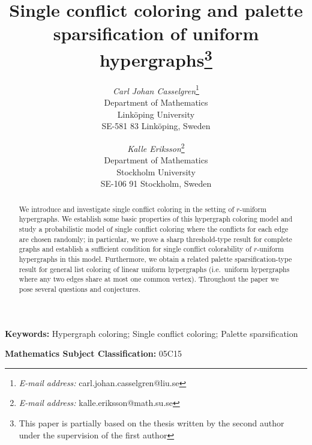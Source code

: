 \documentclass[12pt]{article}
\newcommand{\1}{\mathds{1}}
\begin{document}
\title{Single conflict coloring and palette sparsification of uniform 
hypergraphs\footnote{This paper is partially based on the thesis written 
by the second author under the supervision of the first author}}


\author{
{\sl Carl Johan Casselgren}\thanks{{\it E-mail address:} 
carl.johan.casselgren@liu.se}\\ 
Department of Mathematics \\
Link\"oping University \\ 
SE-581 83 Link\"oping, Sweden
\and
{\sl Kalle Eriksson}\thanks{{\it E-mail address:} 
kalle.eriksson@math.su.se}\\ 
Department of Mathematics \\
Stockholm University \\ 
SE-106 91 Stockholm, Sweden
}
%


\maketitle


\begin{abstract}
	We introduce and investigate single conflict coloring in the setting of 
	$r$-uniform hypergraphs.
	We establish some basic properties of this hypergraph coloring model
	and study a probabilistic model of single conflict coloring where the conflicts for each 
	edge are chosen randomly; in particular,
	we prove a sharp threshold-type result for complete graphs and 
	establish a sufficient condition for
	single conflict colorability of $r$-uniform hypergraphs in this model.
	Furthermore, we obtain a related palette sparsification-type result for general list coloring of linear
	uniform hypergraphs (i.e.\ uniform hypergraphs where any two edges share at most one common vertex).
	Throughout the paper we pose several questions and conjectures.
\end{abstract}

\noindent
{\bf Keywords:}  Hypergraph coloring; Single conflict coloring; Palette sparsification


\noindent
{\bf Mathematics Subject Classification:}  05C15
\end{document}
